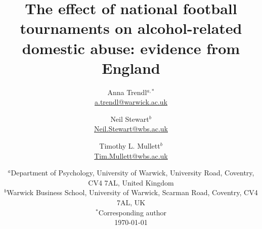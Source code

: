 \documentclass[12pt, a4paper]{article}
\title{}
\author{}
\date{}
\begin{document}
\title{The effect of national football tournaments on alcohol-related domestic abuse: evidence from England}

\author{Anna Trendl$^{a,*}$ \\ \href{mailto:a.trendl@warwick.ac.uk}{a.trendl@warwick.ac.uk}\\
 \and Neil Stewart$^b$ \\ 
 \href{mailto:neil.stewart@wbs.ac.uk}{Neil.Stewart@wbs.ac.uk}
 \\ 
 \and Timothy L. Mullett$^b$ \\
 \href{mailto:Tim.Mullett@wbs.ac.uk}{Tim.Mullett@wbs.ac.uk}
 \\}
 
\date{
    $^a$Department of Psychology, University of Warwick, University Road, Coventry, CV4 7AL, United Kingdom\\
    $^b$Warwick Business School, University of Warwick, Scarman Road, Coventry, CV4 7AL, UK\\
    $^*$Corresponding author\\[2ex]%
    \today
}
\end{document}
